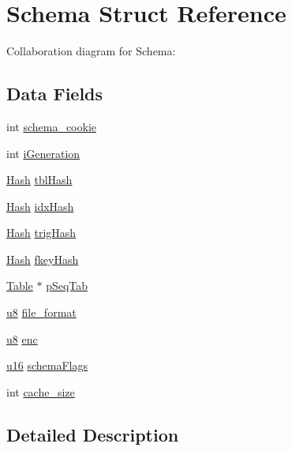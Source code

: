 \hypertarget{struct_schema}{}\section{Schema Struct Reference}
\label{struct_schema}


Collaboration diagram for Schema\+:
\subsection*{Data Fields}
\begin{DoxyCompactItemize}
\item 
int \hyperlink{struct_schema_afc13a3e8bf268d80381d605f3cbd3875}{schema\+\_\+cookie}
\item 
int \hyperlink{struct_schema_a609e1623fdce8c8ab1d6b772fa881d96}{i\+Generation}
\item 
\hyperlink{struct_hash}{Hash} \hyperlink{struct_schema_a65de868624ee47575ce7cc560badd0e7}{tbl\+Hash}
\item 
\hyperlink{struct_hash}{Hash} \hyperlink{struct_schema_ae4ced04fecd92a71adb8e64a4de17541}{idx\+Hash}
\item 
\hyperlink{struct_hash}{Hash} \hyperlink{struct_schema_acf95030df2de6addfbc5ae894c7a9b67}{trig\+Hash}
\item 
\hyperlink{struct_hash}{Hash} \hyperlink{struct_schema_af04ec7c35bed826152f53e5690b2cbf1}{fkey\+Hash}
\item 
\hyperlink{struct_table}{Table} $\ast$ \hyperlink{struct_schema_ae178bc4bdd3ca5ffe4351c10d96950f3}{p\+Seq\+Tab}
\item 
\hyperlink{sqlite3_8c_a74a0f6424ae628af25f23f0a35f6ead3}{u8} \hyperlink{struct_schema_a7d836a44b011f0174f4ae911402287a1}{file\+\_\+format}
\item 
\hyperlink{sqlite3_8c_a74a0f6424ae628af25f23f0a35f6ead3}{u8} \hyperlink{struct_schema_a9c71ab1f0d39a2b088a6d8a1093159c0}{enc}
\item 
\hyperlink{sqlite3_8c_a20f2299e322dcbde37cb07b16910b843}{u16} \hyperlink{struct_schema_a8ad465bc0138580015ac7522b584ea91}{schema\+Flags}
\item 
int \hyperlink{struct_schema_adc2cfac3a357c5424aafa9d351a2e6ea}{cache\+\_\+size}
\end{DoxyCompactItemize}


\subsection{Detailed Description}


